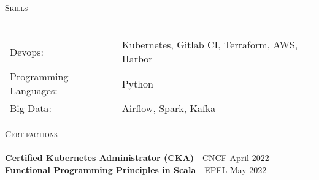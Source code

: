 \documentclass[a4paper]{article}
\newcommand{\lineunder} {
    \vspace*{-8pt} \\
    \hspace*{-18pt} \hrulefill \\
}
\newcommand{\header} [1] {
    {\hspace*{-18pt}\vspace*{6pt} \textsc{#1}}
    \vspace*{-6pt} \lineunder
}
\begin{document}
\header{Skills}
\begin{tabular}{ l l }
	Devops:                & Kubernetes, Gitlab CI, Terraform, AWS, Harbor \\
	Programming Languages: & Python                                        \\
	Big Data:              & Airflow, Spark, Kafka                         \\
\end{tabular}
\vspace{3mm}



\header{Certifactions}
\textbf{Certified Kubernetes Administrator (CKA)} - CNCF \hfill April 2022\\
\vspace*{1mm}
\textbf{Functional Programming Principles in Scala} - EPFL \hfill May 2022\\
\vspace*{1mm}

\ 
\end{document}
